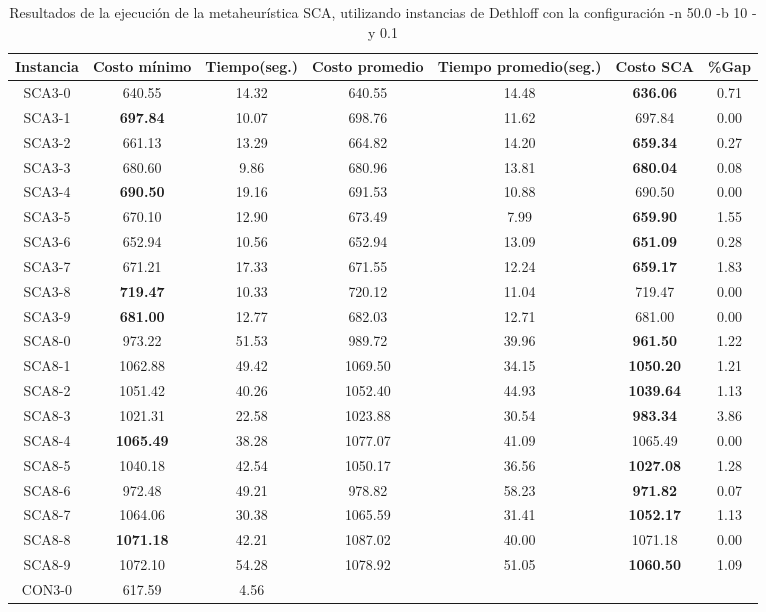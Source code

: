 \begin{table}[ht]
\caption{Resultados de la ejecución de la metaheurística SCA, utilizando instancias de Dethloff con la configuración -n 50.0 -b 10 -y 0.1}
\centering
\small
\begin{tabular}{c c c c c c c}
\hline\hline
Instancia & Costo mínimo & Tiempo(seg.) & Costo promedio & Tiempo promedio(seg.) & Costo SCA & \%Gap \\ [0.5ex]
\hline
SCA3-0 & 640.55 & 14.32 & 
640.55 & 14.48 & \bf{636.06} & 
0.71\\SCA3-1 & \bf{697.84} & 10.07 & 
698.76 & 11.62 & 697.84 & 0.00\\
SCA3-2 & 661.13 & 13.29 & 
664.82 & 14.20 & \bf{659.34} & 
0.27\\SCA3-3 & 680.60 & 9.86 & 
680.96 & 13.81 & \bf{680.04} & 
0.08\\SCA3-4 & \bf{690.50} & 19.16 & 
691.53 & 10.88 & 690.50 & 0.00\\
SCA3-5 & 670.10 & 12.90 & 
673.49 & 7.99 & \bf{659.90} & 
1.55\\SCA3-6 & 652.94 & 10.56 & 
652.94 & 13.09 & \bf{651.09} & 
0.28\\SCA3-7 & 671.21 & 17.33 & 
671.55 & 12.24 & \bf{659.17} & 
1.83\\SCA3-8 & \bf{719.47} & 10.33 & 
720.12 & 11.04 & 719.47 & 0.00\\
SCA3-9 & \bf{681.00} & 12.77 & 
682.03 & 12.71 & 681.00 & 0.00\\
SCA8-0 & 973.22 & 51.53 & 
989.72 & 39.96 & \bf{961.50} & 
1.22\\SCA8-1 & 1062.88 & 49.42 & 
1069.50 & 34.15 & \bf{1050.20} & 
1.21\\SCA8-2 & 1051.42 & 40.26 & 
1052.40 & 44.93 & \bf{1039.64} & 
1.13\\SCA8-3 & 1021.31 & 22.58 & 
1023.88 & 30.54 & \bf{983.34} & 
3.86\\SCA8-4 & \bf{1065.49} & 38.28 & 
1077.07 & 41.09 & 1065.49 & 0.00\\
SCA8-5 & 1040.18 & 42.54 & 
1050.17 & 36.56 & \bf{1027.08} & 
1.28\\SCA8-6 & 972.48 & 49.21 & 
978.82 & 58.23 & \bf{971.82} & 
0.07\\SCA8-7 & 1064.06 & 30.38 & 
1065.59 & 31.41 & \bf{1052.17} & 
1.13\\SCA8-8 & \bf{1071.18} & 42.21 & 
1087.02 & 40.00 & 1071.18 & 0.00\\
SCA8-9 & 1072.10 & 54.28 & 
1078.92 & 51.05 & \bf{1060.50} & 
1.09\\CON3-0 & 617.59 & 4.56 & 

\end{tabular}
\end{table}
